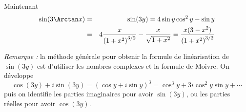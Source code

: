 {\begin{enumerate}
{Maintenant
\begin{eqnarray*}
\sin(3\Arctan x) &=& \sin(3y)= 4 \sin y \cos^2 y - \sin y\\
 &=& 4{\frac {x}{\left (1+{x}^{2}\right )^{3/2}}}-{\frac {x}{\sqrt {1+{x}^{2}}}}={\frac {x(3-x^2)}{\left (1+{x}^{2}\right )^{3/2}}}
\end{eqnarray*}

\bigskip

\emph{Remarque :} la méthode générale pour obtenir la formule de linéarisation de $\sin(3y)$ est 
d'utiliser les nombres complexes
et la formule de Moivre. On développe 
$$\cos(3y) + i \sin(3y) = (\cos y + i \sin y)^3 = \cos^3 y + 3i\cos^2y \sin y + \cdots$$ 
puis on identifie les parties imaginaires pour avoir $\sin(3y)$, 
ou les parties réelles pour avoir $\cos(3y)$.}
\end{enumerate}
}
